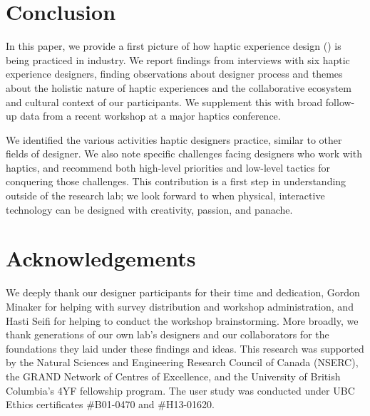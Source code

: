 %
%
\section{Conclusion}
\noindent In this paper, we provide a first picture of how haptic experience design (\haxd) is being practiced in industry.
We report findings from interviews with six haptic experience designers, finding observations about designer process and themes about the holistic nature of haptic experiences and the collaborative ecosystem and cultural context of our participants.
We supplement this with broad follow-up data from a recent workshop at a major haptics conference.

We identified the various activities haptic designers practice, similar to other fields of designer.
We also note specific challenges facing designers who work with haptics, and recommend both high-level priorities and low-level tactics for %
conquering those challenges.
This contribution is a first step in understanding \haxd outside of the research lab; we look forward to when physical, interactive technology can be designed with creativity, passion, and panache.


\section{Acknowledgements}
\noindent
We deeply thank our designer participants for their time and dedication, Gordon Minaker for helping with survey distribution and workshop administration, and Hasti Seifi for helping to conduct the workshop brainstorming.
More broadly, we thank generations of our own lab's designers and our collaborators for the foundations they laid under these findings and ideas.
This research was supported by the Natural Sciences and Engineering Research Council of Canada (NSERC), the GRAND Network of Centres of Excellence, and the University of British Columbia's 4YF fellowship program. The user study was conducted under UBC Ethics certificates \#B01-0470 and \#H13-01620.



\endinput
